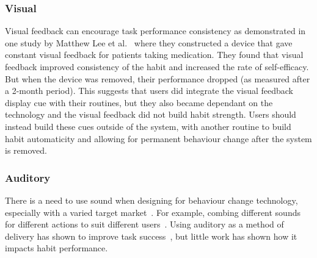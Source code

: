\subsubsection{Visual}
Visual feedback can encourage task performance consistency as demonstrated in one study by Matthew Lee et al.~\cite{article_realtime_feedback_improving_medication_taking} where they constructed a device that gave constant visual feedback for patients taking medication. They found that visual feedback improved consistency of the habit and increased the rate of self-efficacy. But when the device was removed, their performance dropped (as measured after a 2-month period). This suggests that users did integrate the visual feedback display cue with their routines, but they also became dependant on the technology and the visual feedback did not build habit strength. Users should instead build these cues outside of the system, with another routine to build habit automaticity and allowing for permanent behaviour change after the system is removed.

\subsubsection{Auditory}
There is a need to use sound when designing for behaviour change technology, especially with a varied target market~\cite{article_designing_for_health_behaviour_change_hci}. For example, combing different sounds for different actions to suit different users~\cite{article_movipill_improving_medication_elders}. Using auditory as a method of delivery has shown to improve task success~\cite{auditory_notifications_increase_delivery_success}, but little work has shown how it impacts habit performance.

